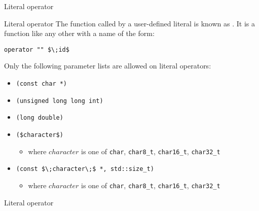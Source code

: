 \begin{frame}{Literal operator}{}
  \begin{block}{Literal operator}
    The function called by a user-defined literal is known as . It is a function like any other with a name of the form:

    {
      \hfill\lstinline[mathescape]!operator "" $\;id$!\hfill
    }

    Only the following parameter lists are allowed on literal operators:
    \begin{itemize}
    \item
      \lstinline!(const char *)!
    \item
      \lstinline!(unsigned long long int)!
    \item
      \lstinline!(long double)!
    \item
      \lstinline[mathescape]!($character$)!
      \begin{itemize}
      \item
        where $character$ is one of \lstinline!char!, \lstinline!char8_t!, \lstinline!char16_t!, \lstinline!char32_t!
      \end{itemize}
    \item
      \lstinline[mathescape]!(const $\;character\;$ *, std::size_t)!
      \begin{itemize}
      \item
        where $character$ is one of \lstinline!char!, \lstinline!char8_t!, \lstinline!char16_t!, \lstinline!char32_t!
      \end{itemize}
    \end{itemize}
  \end{block}
\end{frame}

\begin{frame}{Literal operator}{}
  \begin{example}
  \end{example}
\end{frame}

